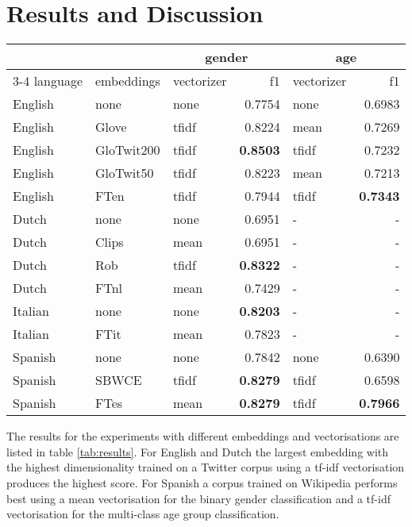 \documentclass[11pt]{article}
\begin{document}
\section{Results and Discussion}

\begin{table*}[ht]
  \centering
  \caption{f1 scores for the different embeddings using optimal SVM parameters}
  \label{tab:results}
  \begin{tabular}{ l l l r l r}
        &            & \multicolumn{2}{c}{gender} & \multicolumn{2}{c}{age} \\
  \cline{3-4} \cline{5-6}
language    & embeddings & vectorizer  & f1        & vectorizer & f1 \\
\hline
English & none       & none        & 0.7754    &  none   & 0.6983 \\
English & Glove      & tfidf       & 0.8224    &  mean   & 0.7269 \\
English & GloTwit200 & tfidf       & \textbf{0.8503}    &  tfidf  & 0.7232 \\
English & GloTwit50  & tfidf       & 0.8223    &  mean   & 0.7213 \\
English & FTen       & tfidf       & 0.7944    &  tfidf  & \textbf{0.7343} \\
Dutch   & none       & none        & 0.6951    &  -      & -      \\
Dutch   & Clips      & mean        & 0.6951    &  -      & -      \\
Dutch   & Rob        & tfidf       & \textbf{0.8322}    &  -      & -      \\
Dutch   & FTnl       & mean        & 0.7429    &  -      & -      \\
Italian & none       & none        & \textbf{0.8203}    &  -      & -      \\
Italian & FTit       & mean        & 0.7823    &  -      & -      \\
Spanish & none       & none        & 0.7842    &  none   & 0.6390 \\
Spanish & SBWCE      & tfidf       & \textbf{0.8279}    &  tfidf  & 0.6598 \\
Spanish & FTes       & mean        & \textbf{0.8279}    &  tfidf  & \textbf{0.7966} \\
  \end{tabular}
\end{table*}

The results for the experiments with different embeddings and vectorisations are listed in table \ref{tab:results}. For English and Dutch the largest embedding with the highest dimensionality trained on a Twitter corpus using a tf-idf vectorisation produces the highest score. For Spanish a corpus trained on Wikipedia performs best using a mean vectorisation for the binary gender classification and a tf-idf vectorisation for the multi-class age group classification.
\end{document}
